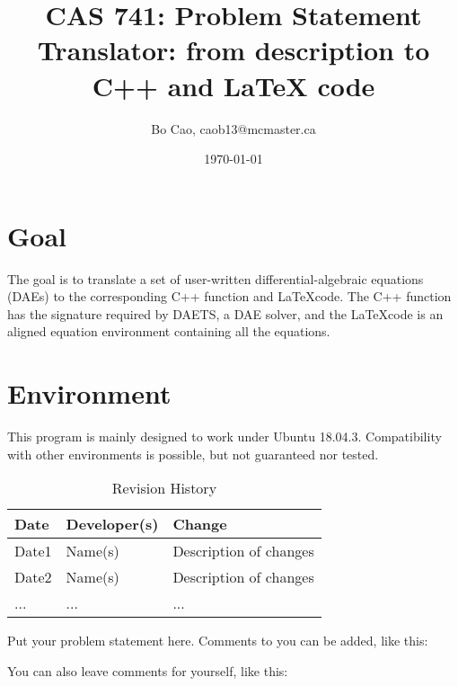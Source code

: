 \documentclass{article}
\title{CAS 741: Problem Statement\\Translator: from description to C++ and \LaTeX\xspace code}
\author{Bo Cao, caob13@mcmaster.ca}
\date{\today}
\begin{document}
\maketitle
\section{Goal}
The goal is to translate a set of user-written differential-algebraic equations (DAEs) to the corresponding C++ function and \LaTeX code. The C++ function has the signature required by DAETS, a DAE solver, and the \LaTeX code is an aligned equation environment containing all the equations.

\section{Environment}
This program is mainly designed to work under Ubuntu 18.04.3. Compatibility with other environments is possible, but not guaranteed nor tested.
 
\begin{table}[hp]
\caption{Revision History} \label{TblRevisionHistory}
\begin{tabularx}{\textwidth}{llX}
\toprule
\textbf{Date} & \textbf{Developer(s)} & \textbf{Change}\\
\midrule
Date1 & Name(s) & Description of changes\\
Date2 & Name(s) & Description of changes\\
... & ... & ...\\
\bottomrule
\end{tabularx}
\end{table}

Put your problem statement here.  Comments to you can be added, like this:


You can also leave comments for yourself, like this:

\end{document}
